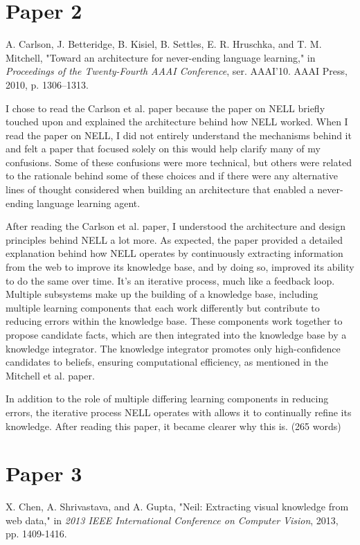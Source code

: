 \documentclass[12pt, letterpaper]{article}
\begin{document}
\section{Paper 2}
\label{sec:Paper 2}
A. Carlson, J. Betteridge, B. Kisiel, B. Settles, E. R. Hruschka, and T. M. Mitchell, "Toward an architecture for never-ending language learning," in \emph{Proceedings of the Twenty-Fourth AAAI Conference}, ser. AAAI'10. AAAI Press, 2010, p. 1306–1313.

I chose to read the Carlson et al. paper because the paper on NELL briefly touched upon and explained the architecture behind how NELL worked. When I read the paper on NELL, I did not entirely understand the mechanisms behind it and felt a paper that focused solely on this would help clarify many of my confusions. Some of these confusions were more technical, but others were related to the rationale behind some of these choices and if there were any alternative lines of thought considered when building an architecture that enabled a never-ending language learning agent.

After reading the Carlson et al. paper, I understood the architecture and design principles behind NELL a lot more. As expected, the paper provided a detailed explanation behind how NELL operates by continuously extracting information from the web to improve its knowledge base, and by doing so, improved its ability to do the same over time. It's an iterative process, much like a feedback loop. Multiple subsystems make up the building of a knowledge base, including multiple learning components that each work differently but contribute to reducing errors within the knowledge base. These components work together to propose candidate facts, which are then integrated into the knowledge base by a knowledge integrator. The knowledge integrator promotes only high-confidence candidates to beliefs, ensuring computational efficiency, as mentioned in the Mitchell et al. paper.

In addition to the role of multiple differing learning components in reducing errors, the iterative process NELL operates with allows it to continually refine its knowledge. After reading this paper, it became clearer why this is. (265 words)

\section{Paper 3}
\label{sec:Paper 3}
X. Chen, A. Shrivastava, and A. Gupta, "Neil: Extracting visual knowledge from web data," in \emph{2013 IEEE International Conference on Computer Vision}, 2013, pp. 1409-1416.
\end{document}
